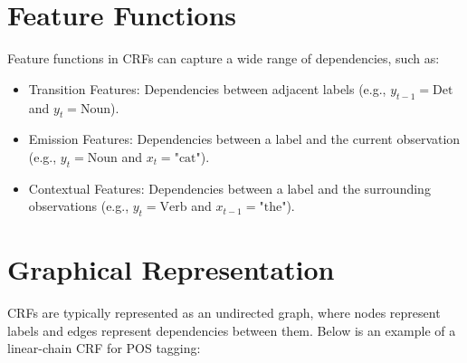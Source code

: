 \begin{notechapter}
\section{Feature Functions}
Feature functions in CRFs can capture a wide range of 
dependencies, such as:
\begin{itemize}
    \item Transition Features: Dependencies between 
          adjacent labels (e.g., \( y_{t-1} = \text{Det} \) 
          and \( y_t = \text{Noun} \)).
    \item Emission Features: Dependencies between a 
          label and the current observation (e.g., 
          \( y_t = \text{Noun} \) and \( x_t = \text{"cat"} \)).
    \item Contextual Features: Dependencies between a 
          label and the surrounding observations (e.g., 
          \( y_t = \text{Verb} \) and \( x_{t-1} = \text{"the"} \)).
\end{itemize}

\section{Graphical Representation}
CRFs are typically represented as an undirected graph, 
where nodes represent labels and edges represent 
dependencies between them. Below is an example of a 
linear-chain CRF for POS tagging:

\begin{center}
\end{center}
\end{notechapter}
